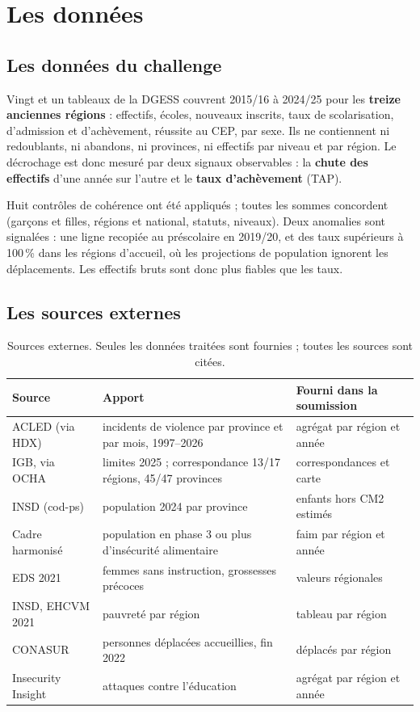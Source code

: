 \documentclass[11pt,a4paper]{article}
\begin{document}
\section{Les données}
\subsection{Les données du challenge}
Vingt et un tableaux de la DGESS couvrent 2015/16 à 2024/25 pour les \textbf{treize anciennes régions} : effectifs, écoles, nouveaux inscrits, taux de scolarisation, d'admission et d'achèvement, réussite au CEP, par sexe. Ils ne contiennent ni redoublants, ni abandons, ni provinces, ni effectifs par niveau et par région. Le décrochage est donc mesuré par deux signaux observables : la \textbf{chute des effectifs} d'une année sur l'autre et le \textbf{taux d'achèvement} (TAP).

Huit contrôles de cohérence ont été appliqués ; toutes les sommes concordent (garçons et filles, régions et national, statuts, niveaux). Deux anomalies sont signalées : une ligne recopiée au préscolaire en 2019/20, et des taux supérieurs à 100\,\% dans les régions d'accueil, où les projections de population ignorent les déplacements. Les effectifs bruts sont donc plus fiables que les taux.

\subsection{Les sources externes}
\begin{table}[H]\centering\small
\begin{tabularx}{\textwidth}{@{}lXX@{}}\toprule
Source & Apport & Fourni dans la soumission\\\midrule
ACLED (via HDX) & incidents de violence par province et par mois, 1997--2026 & agrégat par région et année\\
IGB, via OCHA & limites 2025 ; correspondance 13/17 régions, 45/47 provinces & correspondances et carte\\
INSD (cod-ps) & population 2024 par province & enfants hors CM2 estimés\\
Cadre harmonisé & population en phase 3 ou plus d'insécurité alimentaire & faim par région et année\\
EDS 2021 & femmes sans instruction, grossesses précoces & valeurs régionales\\
INSD, EHCVM 2021 & pauvreté par région & tableau par région\\
CONASUR & personnes déplacées accueillies, fin 2022 & déplacés par région\\
Insecurity Insight & attaques contre l'éducation & agrégat par région et année\\\bottomrule
\end{tabularx}\caption{Sources externes. Seules les données traitées sont fournies ; toutes les sources sont citées.}\end{table}
\end{document}
